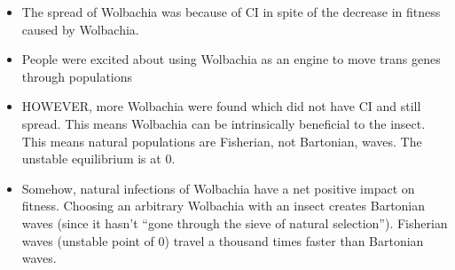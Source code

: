 \documentclass{article}
\begin{document}
\begin{itemize}
        \item The spread of Wolbachia was because of CI in spite of the decrease in fitness caused by Wolbachia.
        \item People were excited about using Wolbachia as an engine to move trans genes through populations
        \item HOWEVER, more Wolbachia were found which did not have CI and still spread.  This means Wolbachia can be intrinsically beneficial to the insect.  This means natural populations are Fisherian, not Bartonian, waves.  The unstable equilibrium is at $0$.
        \item Somehow, natural infections of Wolbachia have a net positive impact on fitness.  Choosing an arbitrary Wolbachia with an insect creates Bartonian waves (since it hasn't ``gone through the sieve of natural selection'').  Fisherian waves (unstable point of $0$) travel a thousand times faster than Bartonian waves.
    \end{itemize}
\end{document}
